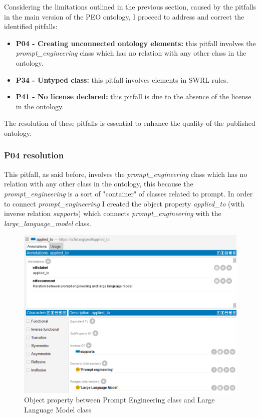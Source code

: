 Considering the limitations outlined in the previous section, caused by the pitfalls in the main version of the PEO ontology, I proceed to address and correct the identified pitfalls:
\begin{itemize}
    \item \textbf{P04 - Creating unconnected ontology elements:} this pitfall involves the \textit{prompt\_engineering} class which has no relation with any other class in the ontology.

    \item \textbf{P34 - Untyped class:} this pitfall involves elements in SWRL rules.

    \item \textbf{P41 - No license declared:} this pitfall is due to the absence of the license in the ontology.
\end{itemize}
The resolution of these pitfalls is essential to enhance the quality of the published ontology.

\subsubsection{P04 resolution}
This pitfall, as said before, involves the \textit{prompt\_engineering} class which has no relation with any other class in the ontology, this because the \textit{prompt\_engineering} is a sort of "container" of classes related to prompt. In order to connect \textit{prompt\_engineering} I created the object property \textit{applied\_to} (with inverse relation \textit{supports}) which connects \textit{prompt\_engineering} with the \textit{large\_language\_model} class.

\begin{figure}[H]
    \centering
    \includegraphics[width=0.7\linewidth]{Figures/fig_78.png}
    \caption{Object property between Prompt Engineering class and Large Language Model class}
    \label{fig:enter-label}
\end{figure}

